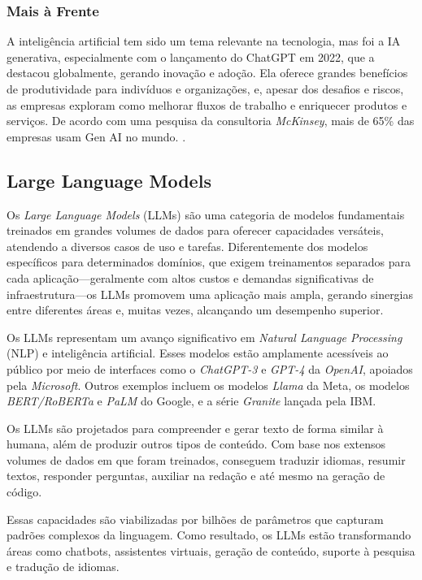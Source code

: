 \documentclass[a4paper, 12pt]{article}
\newcommand{\citeb}[1]{\bibleftbracket\cite{#1}\bibrightbracket}
\begin{document}
    \subsubsection{Mais à Frente}

    A inteligência artificial tem sido um tema relevante na tecnologia, mas foi a IA generativa, especialmente com o lançamento do ChatGPT em 2022, que a destacou globalmente, gerando inovação e adoção. Ela oferece grandes benefícios de produtividade para indivíduos e organizações, e, apesar dos desafios e riscos, as empresas exploram como melhorar fluxos de trabalho e enriquecer produtos e serviços. De acordo com uma pesquisa da consultoria \textit{McKinsey}, mais de 65\% das empresas usam Gen AI no mundo. \citeb{mckinsey_genai}.

    \subsection{Large Language Models}

    Os \textit{Large Language Models} (LLMs) são uma categoria de modelos fundamentais treinados em grandes volumes de dados para oferecer capacidades versáteis, atendendo a diversos casos de uso e tarefas. Diferentemente dos modelos específicos para determinados domínios, que exigem treinamentos separados para cada aplicação—geralmente com altos custos e demandas significativas de infraestrutura—os LLMs promovem uma aplicação mais ampla, gerando sinergias entre diferentes áreas e, muitas vezes, alcançando um desempenho superior. \citeb{llm_ibm}

    Os LLMs representam um avanço significativo em \textit{Natural Language Processing} (NLP) e inteligência artificial. Esses modelos estão amplamente acessíveis ao público por meio de interfaces como o \textit{ChatGPT-3} e \textit{GPT-4} da \textit{OpenAI}, apoiados pela \textit{Microsoft}. Outros exemplos incluem os modelos \textit{Llama} da Meta, os modelos \textit{BERT/RoBERTa} e \textit{PaLM} do Google, e a série \textit{Granite} lançada pela IBM.

    Os LLMs são projetados para compreender e gerar texto de forma similar à humana, além de produzir outros tipos de conteúdo. Com base nos extensos volumes de dados em que foram treinados, conseguem traduzir idiomas, resumir textos, responder perguntas, auxiliar na redação e até mesmo na geração de código.

    Essas capacidades são viabilizadas por bilhões de parâmetros que capturam padrões complexos da linguagem. Como resultado, os LLMs estão transformando áreas como chatbots, assistentes virtuais, geração de conteúdo, suporte à pesquisa e tradução de idiomas.
\end{document}
